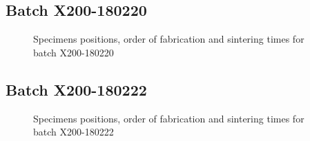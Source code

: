 \newpage
\subsection{Batch X200-180220}
\begin{figure}[h]
\centering
\noindent{}
\decoRule
\caption[Specimens positions, order of fabrication and sintering times for batch X200-180220]{Specimens positions, order of fabrication and sintering times for batch X200-180220}
\label{fig:180220-cad}
\end{figure}

\newpage
\subsection{Batch X200-180222}

\begin{figure}[ht]
\centering
\noindent{}
\decoRule
\caption[Specimens positions, order of fabrication and sintering times for batch X200-180222]{Specimens positions, order of fabrication and sintering times for batch X200-180222}
\label{fig:180222-cad}
\end{figure}

